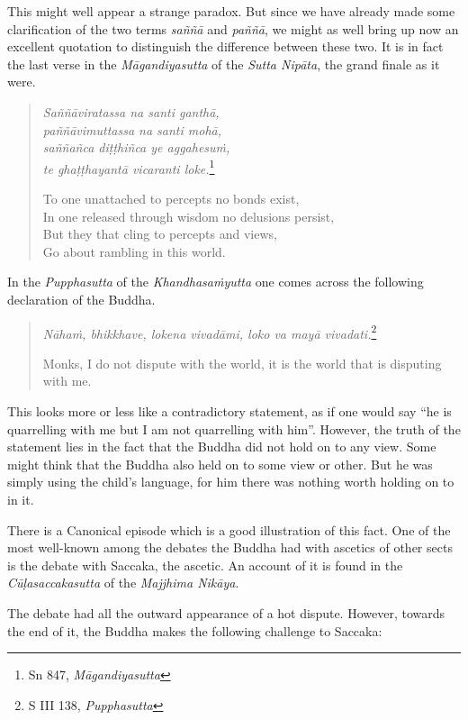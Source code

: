 This might well appear a strange paradox. But since we have already made some clarification of the two terms \emph{saññā} and \emph{paññā}, we might as well bring up now an excellent quotation to distinguish the difference between these two. It is in fact the last verse in the \emph{Māgandiyasutta} of the \emph{Sutta Nipāta}, the grand finale as it were.

\begin{quote}
\emph{Saññāviratassa na santi ganthā,}\\
\emph{paññāvimuttassa na santi mohā,}\\
\emph{saññañca diṭṭhiñca ye aggahesuṁ,}\\
\emph{te ghaṭṭhayantā vicaranti loke.}\footnote{Sn 847, \emph{Māgandiyasutta}}

To one unattached to percepts no bonds exist,\\
In one released through wisdom no delusions persist,\\
But they that cling to percepts and views,\\
Go about rambling in this world.
\end{quote}

In the \emph{Pupphasutta} of the \emph{Khandhasaṁyutta} one comes across the following declaration of the Buddha.

\begin{quote}
\emph{Nāhaṁ, bhikkhave, lokena vivadāmi, loko va mayā vivadati.}\footnote{S III 138, \emph{Pupphasutta}}

Monks, I do not dispute with the world, it is the world that is disputing with me.
\end{quote}

This looks more or less like a contradictory statement, as if one would say ``he is quarrelling with me but I am not quarrelling with him''. However, the truth of the statement lies in the fact that the Buddha did not hold on to any view. Some might think that the Buddha also held on to some view or other. But he was simply using the child's language, for him there was nothing worth holding on to in it.

There is a Canonical episode which is a good illustration of this fact. One of the most well-known among the debates the Buddha had with ascetics of other sects is the debate with Saccaka, the ascetic. An account of it is found in the \emph{Cūḷasaccakasutta} of the \emph{Majjhima Nikāya}.

The debate had all the outward appearance of a hot dispute. However, towards the end of it, the Buddha makes the following challenge to Saccaka:

